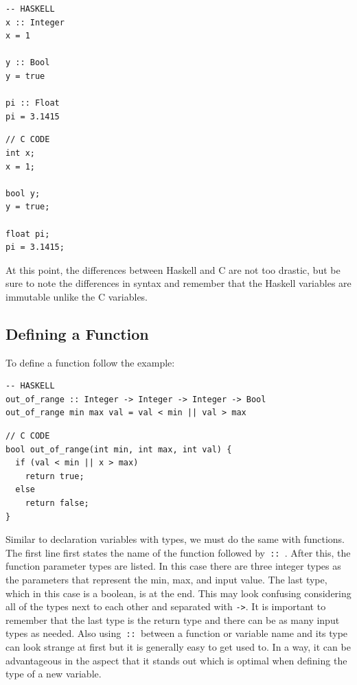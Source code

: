 \documentclass{article}
\begin{document}
\begin{lstlisting}[style=HaskellStyle]
-- HASKELL
x :: Integer
x = 1

y :: Bool
y = true

pi :: Float
pi = 3.1415
\end{lstlisting}

\begin{lstlisting}[style=CStyle]
// C CODE
int x;
x = 1;

bool y;
y = true;

float pi;
pi = 3.1415;
\end{lstlisting}

\medskip\noindent
At this point, the differences between Haskell and C are not too drastic, but be sure to note the differences in syntax and remember that the Haskell variables are immutable unlike the C variables.

\subsection{Defining a Function}
\medskip\noindent
To define a function follow the example:

\begin{lstlisting}[style=HaskellStyle]
-- HASKELL
out_of_range :: Integer -> Integer -> Integer -> Bool
out_of_range min max val = val < min || val > max
\end{lstlisting}

\begin{lstlisting}[style=CStyle]
// C CODE
bool out_of_range(int min, int max, int val) {
  if (val < min || x > max)
    return true;
  else
    return false;
}
\end{lstlisting}

\medskip\noindent
Similar to declaration variables with types, we must do the same with functions. The first line first states the name of the function followed by\verb| :: |. After this, the function parameter types are listed. In this case there are three integer types as the parameters that represent the min, max, and input value. The last type, which in this case is a boolean, is at the end. This may look confusing considering all of the types next to each other and separated with \verb|->|. It is important to remember that the last type is the return type and there can be as many input types as needed. Also using\verb| :: |between a function or variable name and its type can look strange at first but it is generally easy to get used to. In a way, it can be advantageous in the aspect that it stands out which is optimal when defining the type of a new variable.
\end{document}

